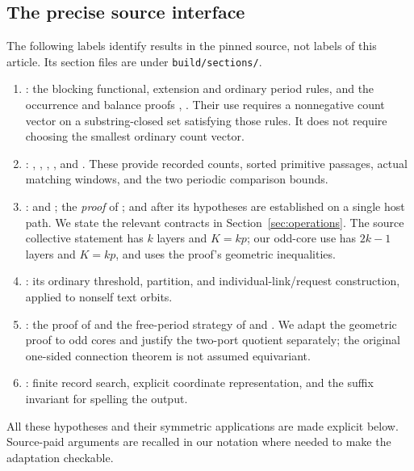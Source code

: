 \subsection{The precise source interface}\label{sec:contracts}
The following labels identify results in the pinned source, not labels
of this article. Its section files are under \texttt{build/sections/}.
\begin{enumerate}
\item {}: the blocking functional, extension and
ordinary period rules, and the occurrence and balance proofs
, . Their use requires a nonnegative
count vector on a substring-closed set satisfying those rules. It does
not require choosing the smallest ordinary count vector.
\item {}: , ,
, , and
. These provide recorded counts, sorted primitive
passages, actual matching windows, and the two periodic comparison bounds.
\item {}:  and
; the \emph{proof} of ; and
 after its hypotheses are established on a single host
path. We state the relevant contracts in Section~\ref{sec:operations}.
The source collective statement has $k$ layers and $K=kp$; our odd-core
use has $2k-1$ layers and $K=kp$, and uses the proof's geometric inequalities.
\item {}: its ordinary threshold, partition,
and individual-link/request construction, applied to nonself text orbits.
\item {}: the proof of 
and the free-period strategy of  and
. We adapt the geometric proof to odd cores and
justify the two-port quotient separately; the original one-sided
connection theorem is not assumed equivariant.
\item {}: finite record search, explicit coordinate
representation, and the suffix invariant for spelling the output.
\end{enumerate}
All these hypotheses and their symmetric applications are made explicit
below. Source-paid arguments are recalled in our notation where needed to
make the adaptation checkable.

